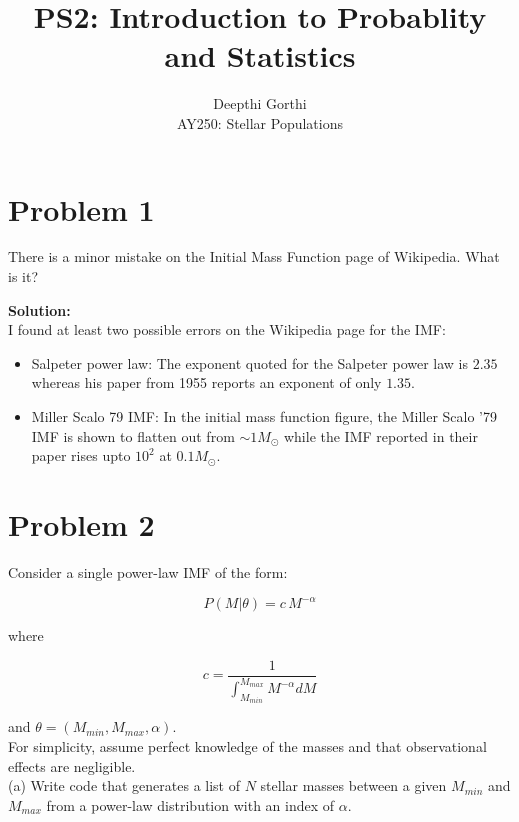 \documentclass[12pt,usletter,english]{article}
\begin{document}
\title{PS2: Introduction to Probablity and Statistics} \author{Deepthi
  Gorthi\\ AY250: Stellar Populations} \maketitle

\section{Problem 1}

There is a minor mistake on the Initial Mass Function page of
Wikipedia.  What is it?

\noindent \textbf{Solution:}\\

I found at least two possible errors on the Wikipedia page for the IMF:

\begin{itemize}
\item Salpeter power law: The exponent quoted for the Salpeter power
  law is $2.35$ whereas his paper from 1955 reports an exponent of
  only $1.35$.
\item Miller Scalo 79 IMF: In the initial mass function figure, the
  Miller Scalo '79 IMF is shown to flatten out from $\sim 1M_{\odot}$
  while the IMF reported in their paper rises upto $10^2$ at
  $0.1M_{\odot}$.
\end{itemize}

\section{Problem 2}
Consider a single power-law IMF of the form:

\begin{equation}
P(M | \theta) = c \, M^{-\alpha}
\end{equation}

\noindent where 

\begin{equation}
c = \frac{1}{\int_{M_{min}}^{M_{max}} M^{-\alpha} dM} 
\end{equation}

\noindent and $\theta = (M_{min}, M_{max}, \alpha )$. \\

For simplicity, assume perfect knowledge of the masses and that
observational effects are negligible.  \\


(a) Write code that generates a list of $N$ stellar masses between a
given $M_{min}$ and $M_{max}$ from a power-law distribution with an
index of $\alpha$.\\
\end{document}
